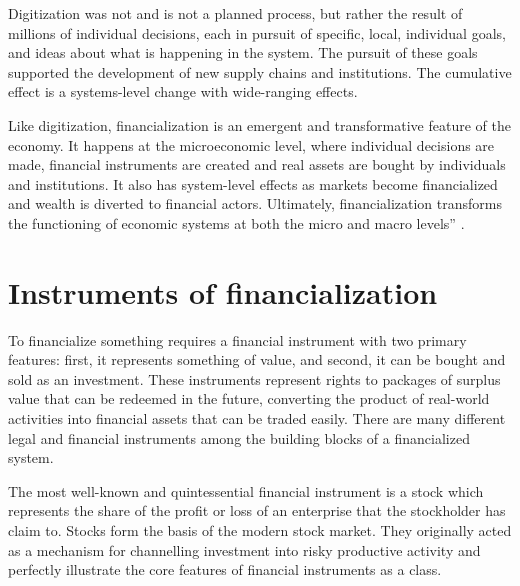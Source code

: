 Digitization was not and is not a planned process, but rather the result of millions of individual decisions, each in pursuit of specific, local, individual goals, and ideas about what is happening in the system. The pursuit of these goals supported the development of new supply chains and institutions. %
The cumulative effect is a systems-level change with wide-ranging effects.  

Like digitization, financialization is an emergent and transformative feature of the economy. It happens at the microeconomic level, where individual decisions are made, financial instruments are created and real assets are bought by individuals and institutions. It also has system-level effects as markets become financialized and wealth is diverted to financial actors. Ultimately, financialization transforms the functioning of economic systems at both the micro and macro levels'' \cite{palleyFinancializationWhatIt2007}.  


\section{Instruments of financialization }

To financialize something requires a \gls{financial instrument} with two primary features: first, it represents something of value, and second, it can be bought and sold as an investment. These instruments represent rights to packages of surplus value that can be redeemed in the future, converting the product of real-world activities into financial assets that can be traded easily.   %
There are many different legal and financial instruments among the building blocks of a financialized system. 

The most well-known and quintessential financial instrument is a stock which represents the share of the profit or loss of an enterprise that the stockholder has claim to. Stocks form the basis of the modern stock market. %
They originally acted as a mechanism for channelling investment into risky productive activity and perfectly illustrate the core features of financial instruments as a class. %

